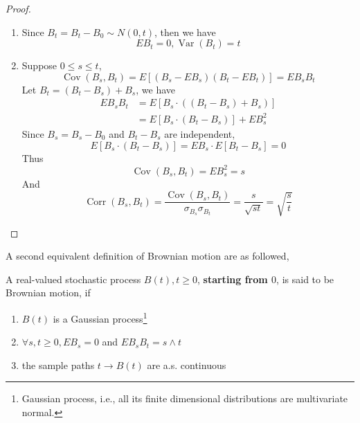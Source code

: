 \begin{proof}
	\begin{enumerate}
		\item Since $B_{t}=B_{t}-B_{0}\sim N(0, t)$, then we have
		      \begin{equation*}
			      EB_{t}=0,\operatorname{Var}\left(B_{t}\right)=t
		      \end{equation*}
		\item Suppose $0\leq s\leq t$,
		      \begin{equation*}
			      \operatorname{Cov}\left(B_{s}, B_{t}\right)=E\left[\left(B_{s}-EB_{s}\right)\left(B_{t}-EB_{t}\right)\right]=EB_{s}B_{t}
		      \end{equation*}
		      Let $B_{t}=\left(B_{t}-B_{s}\right)+B_{s}$, we have
		      \begin{equation*}
			      \begin{aligned}
				      EB_{s}B_{t} & =E\left[B_{s}\cdot\left(\left(B_{t}-B_{s}\right)+B_{s}\right)\right] \\
				                  & =E\left[B_{s}\cdot\left(B_{t}-B_{s}\right)\right]+EB_{s}^{2}
			      \end{aligned}
		      \end{equation*}
		      Since $B_{s}=B_{s}-B_{0}$ and $B_{t}-B_{s}$ are independent,
		      \begin{equation*}
			      E\left[B_{s} \cdot\left(B_{t}-B_{s}\right)\right]=EB_{s} \cdot E\left[B_{t}-B_{s}\right]=0
		      \end{equation*}
		      Thus
		      \begin{equation*}
			      \operatorname{Cov}\left(B_{s}, B_{t}\right)=EB_{s}^{2}=s
		      \end{equation*}
		      And
		      \begin{equation*}
			      \operatorname{Corr}\left(B_{s},B_{t}\right)=\frac{\operatorname{Cov}\left(B_{s},B_{t}\right)}{\sigma_{B_{s}}\sigma_{B_{t}}}=\frac{s}{\sqrt{st}}=\sqrt{\frac{s}{t}}
		      \end{equation*}
	\end{enumerate}
\end{proof}

A second equivalent definition of Brownian motion are as followed,

\begin{definition}
	A real-valued stochastic process $B(t),t\geq 0$, \textbf{starting from $0$}, is said to be Brownian motion, if
	\begin{enumerate}
		\item $B(t)$ is a Gaussian process\footnote{Gaussian process, i.e., all its finite dimensional distributions are multivariate normal.}
		\item $\forall s,t\geq 0,EB_{s}=0$ and $EB_{s}B_{t}=s\wedge t$
		\item the sample paths $t\rightarrow B(t)$ are a.s. continuous
	\end{enumerate}
\end{definition}

